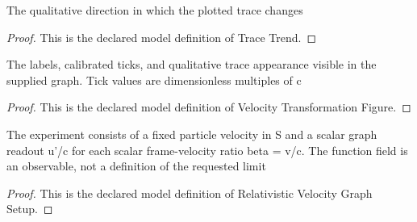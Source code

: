 \begin{definition}
  \label{def:physics:phyx-mini-0595:phyxminiproblems-problemphyxmini0595-tracetrend}
  The qualitative direction in which the plotted trace changes
\end{definition}
\begin{proof}
  This is the declared model definition of Trace Trend.
\end{proof}
\begin{definition}
  \label{def:physics:phyx-mini-0595:phyxminiproblems-problemphyxmini0595-velocitytransformationfigure}
  The labels, calibrated ticks, and qualitative trace appearance visible in the supplied graph. Tick values are dimensionless multiples of c
\end{definition}
\begin{proof}
  This is the declared model definition of Velocity Transformation Figure.
\end{proof}
\begin{definition}
  \label{def:physics:phyx-mini-0595:phyxminiproblems-problemphyxmini0595-relativisticvelocitygraphsetup}
  The experiment consists of a fixed particle velocity in S and a scalar graph readout u'/c for each scalar frame-velocity ratio beta = v/c. The function field is an observable, not a definition of the requested limit
\end{definition}
\begin{proof}
  This is the declared model definition of Relativistic Velocity Graph Setup.
\end{proof}
